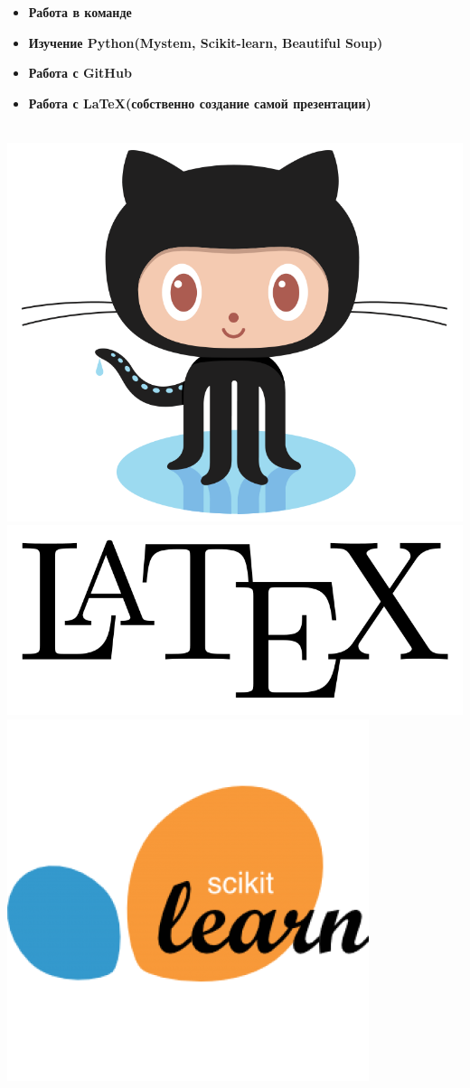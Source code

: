 \documentclass[t]{beamer}
\begin{document}
	
	\begin{frame}
		\frametitle{\insertsection}
		\begin{itemize}
			\item \textbf{Работа в команде}
			\item \textbf{Изучение Python(Mystem, Scikit-learn, Beautiful Soup)}
			\item \textbf{Работа с GitHub}
			\item \textbf{Работа с \LaTeX (собственно создание самой презентации)}
		\end{itemize}
		~~~~~~~~~
		\includegraphics[scale = 0.08]{images/git_hub.png}
		\includegraphics[scale = 0.08]{images/latex-logo.png}
		\includegraphics[scale = 0.2]{images/scikit_learn.png}

\end{frame}
\end{document}

